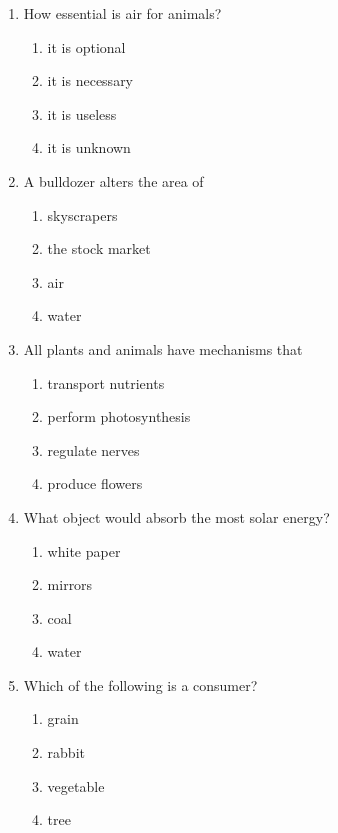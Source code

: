 \documentclass[12pt]{article}
\begin{document}
\begin{enumerate}[label=\arabic*.]
\begin{enumerate}[label=(\alph*)]
    \item increased inorganic matter in soil
    \item increased use of fertilizers on crops
    \item increased buildup of greenhouse gases
    \item increased rainfall rates near power plants
\end{enumerate}
\item How essential is air for animals?
\begin{enumerate}[label=(\alph*)]
    \item it is optional
    \item it is necessary
    \item it is useless
    \item it is unknown
\end{enumerate}
\item A bulldozer alters the area of
\begin{enumerate}[label=(\alph*)]
    \item skyscrapers
    \item the stock market
    \item air
    \item water
\end{enumerate}
\item All plants and animals have mechanisms that
\begin{enumerate}[label=(\alph*)]
    \item transport nutrients
    \item perform photosynthesis
    \item regulate nerves
    \item produce flowers
\end{enumerate}
\item What object would absorb the most solar energy?
\begin{enumerate}[label=(\alph*)]
    \item white paper
    \item mirrors
    \item coal
    \item water
\end{enumerate}
\item Which of the following is a consumer?
\begin{enumerate}[label=(\alph*)]
    \item grain
    \item rabbit
    \item vegetable
    \item tree
\end{enumerate}
\end{enumerate}
\end{document}
